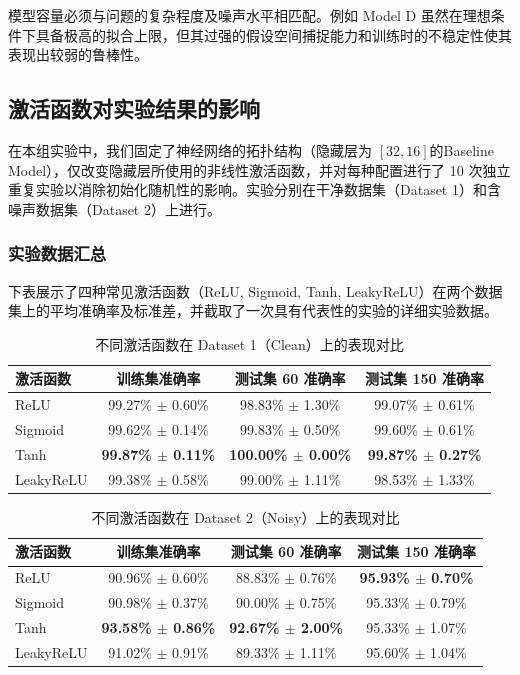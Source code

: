 模型容量必须与问题的复杂程度及噪声水平相匹配。例如 Model D 虽然在理想条件下具备极高的拟合上限，但其过强的假设空间捕捉能力和训练时的不稳定性使其表现出较弱的鲁棒性。

\subsection{激活函数对实验结果的影响}在本组实验中，我们固定了神经网络的拓扑结构（隐藏层为 $[32, 16]$的Baseline Model），仅改变隐藏层所使用的非线性激活函数，并对每种配置进行了 10 次独立重复实验以消除初始化随机性的影响。实验分别在干净数据集（Dataset 1）和含噪声数据集（Dataset 2）上进行。

\subsubsection{实验数据汇总}

下表展示了四种常见激活函数（ReLU, Sigmoid, Tanh, LeakyReLU）在两个数据集上的平均准确率及标准差，并截取了一次具有代表性的实验的详细实验数据。

\begin{table}[htbp]
	\centering
	\caption{不同激活函数在 Dataset 1（Clean）上的表现对比}
	\begin{tabular}{lccc}
		\hline
		\textbf{激活函数} & \textbf{训练集准确率} & \textbf{测试集 60 准确率} & \textbf{测试集 150 准确率} \\ \hline
		ReLU      & 99.27\% $\pm$ 0.60\% & 98.83\% $\pm$ 1.30\% & 99.07\% $\pm$ 0.61\% \\
		Sigmoid   & 99.62\% $\pm$ 0.14\% & 99.83\% $\pm$ 0.50\% & 99.60\% $\pm$ 0.61\% \\
		Tanh      & \textbf{99.87\% $\pm$ 0.11\%} & \textbf{100.00\% $\pm$ 0.00\%} & \textbf{99.87\% $\pm$ 0.27\%} \\
		LeakyReLU & 99.38\% $\pm$ 0.58\% & 99.00\% $\pm$ 1.11\% & 98.53\% $\pm$ 1.33\% \\ \hline
	\end{tabular}
\end{table}

\begin{table}[htbp]
	\centering
	\caption{不同激活函数在 Dataset 2（Noisy）上的表现对比}
	\begin{tabular}{lccc}
		\hline
		\textbf{激活函数} & \textbf{训练集准确率} & \textbf{测试集 60 准确率} & \textbf{测试集 150 准确率} \\ \hline
		ReLU      & 90.96\% $\pm$ 0.60\% & 88.83\% $\pm$ 0.76\% & \textbf{95.93\% $\pm$ 0.70\%} \\
		Sigmoid   & 90.98\% $\pm$ 0.37\% & 90.00\% $\pm$ 0.75\% & 95.33\% $\pm$ 0.79\% \\
		Tanh      & \textbf{93.58\% $\pm$ 0.86\%} & \textbf{92.67\% $\pm$ 2.00\%} & 95.33\% $\pm$ 1.07\% \\
		LeakyReLU & 91.02\% $\pm$ 0.91\% & 89.33\% $\pm$ 1.11\% & 95.60\% $\pm$ 1.04\% \\ \hline
	\end{tabular}
\end{table}

